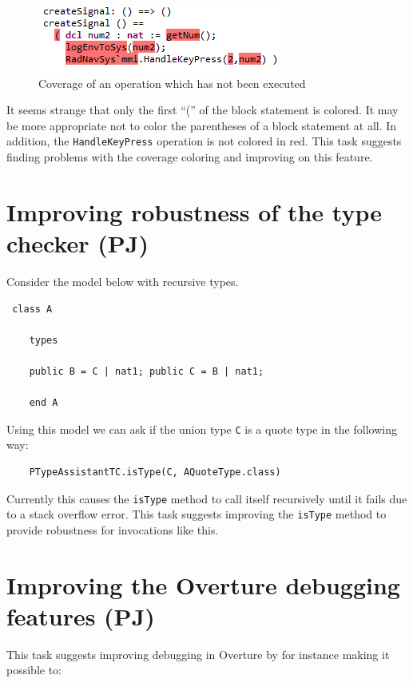 \documentclass[11pt]{overturerep}
\begin{document}
\begin{figure}[!ht] \centering \includegraphics{figures/coverage}
    \caption{Coverage of an operation which has not been
    executed}\label{figure:Coverage} 
\end{figure}

It seems strange that only the first ``('' of the block statement is colored.
It may be more appropriate not to color the parentheses of a block statement at
all. In addition, the \texttt{HandleKeyPress} operation is not colored in red.
This task suggests finding problems with the coverage coloring and improving on
this feature.

\section{Improving robustness of the type checker (PJ)}

Consider the model below with recursive types.

\begin{lstlisting} class A

    types

    public B = C | nat1; public C = B | nat1; 

    end A 
\end{lstlisting}

Using this model we can ask if the union type \texttt{C} is a quote type in the
following way:

\begin{lstlisting} 
    PTypeAssistantTC.isType(C, AQuoteType.class)
\end{lstlisting}

Currently this causes the \texttt{isType} method to call itself recursively
until it fails due to a stack overflow error. This task suggests improving the
\texttt{isType} method to provide robustness for invocations like this.

\section{Improving the Overture debugging features (PJ)}

This task suggests improving debugging in Overture by for instance making it
possible to:
\end{document}
